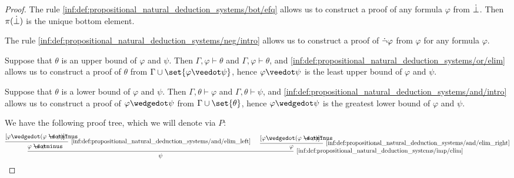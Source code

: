 \begin{proof}
   The rule \ref{inf:def:propositional_natural_deduction_systems/bot/efq} allows us to construct a proof of any formula \( \varphi \) from \( \dot{\bot} \). Then \( \pi(\dot{\bot}) \) is the unique bottom element.

   The rule \ref{inf:def:propositional_natural_deduction_systems/neg/intro} allows us to construct a proof of \( \dot{\neg} \varphi \) from \( \varphi \) for any formula \( \varphi \).

   Suppose that \( \theta \) is an upper bound of \( \varphi \) and \( \psi \). Then \( \Gamma, \varphi \vdash \theta \) and \( \Gamma, \varphi \vdash \theta \), and \ref{inf:def:propositional_natural_deduction_systems/or/elim} allows us to construct a proof of \( \theta \) from \( \Gamma \cup \set{ \varphi \synvee \psi } \), hence \( \varphi \synvee \psi \) is the least upper bound of \( \varphi \) and \( \psi \).

   Suppose that \( \theta \) is a lower bound of \( \varphi \) and \( \psi \). Then \( \Gamma, \theta \vdash \varphi \) and \( \Gamma, \theta \vdash \psi \), and \ref{inf:def:propositional_natural_deduction_systems/and/intro} allows us to construct a proof of \( \varphi \synwedge \psi \) from \( \Gamma \cup \set{ \theta } \), hence \( \varphi \synwedge \psi \) is the greatest lower bound of \( \varphi \) and \( \psi \).



  We have the following proof tree, which we will denote via \( P \):
  \begin{equation*}
    \begin{prooftree}
      \hypo{ [\varphi \synwedge (\varphi \synimplies \psi)]^u }
      \infer1[\ref{inf:def:propositional_natural_deduction_systems/and/elim_left}]{ \varphi \synimplies \psi }

      \hypo{ [\varphi \synwedge (\varphi \synimplies \psi)]^u }
      \infer1[\ref{inf:def:propositional_natural_deduction_systems/and/elim_right}]{ \varphi }

      \infer2[\ref{inf:def:propositional_natural_deduction_systems/imp/elim}]{ \psi }
    \end{prooftree}
  \end{equation*}


\end{proof}
